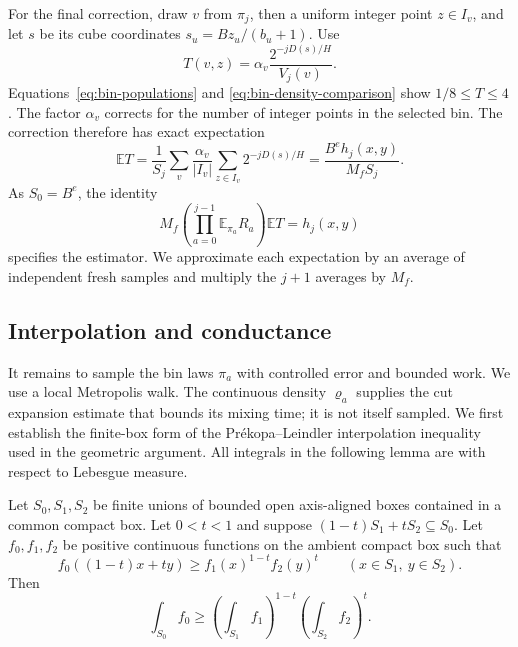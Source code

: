 For the final correction, draw $v$ from $\pi_j$, then a uniform integer
point $z\in I_v$, and let $s$ be its cube coordinates
$s_u=Bz_u/(b_u+1)$.  Use
\begin{equation}
 T(v,z)=\alpha_v\frac{2^{-jD(s)/H}}{V_j(v)}.
 \label{eq:oracle-correction}
\end{equation}
Equations~\eqref{eq:bin-populations} and
\eqref{eq:bin-density-comparison} show $1/8\le T\le4$.
The factor $\alpha_v$ corrects for the number of integer points in
the selected bin. The correction therefore has exact expectation
\[
 \mathbb E T
 =\frac{1}{S_j}\sum_v\frac{\alpha_v}{|I_v|}
                         \sum_{z\in I_v}2^{-jD(s)/H}
 =\frac{B^eh_j(x,y)}{M_fS_j}.
\]
As $S_0=B^e$, the identity
\begin{equation}
 M_f\left(\prod_{a=0}^{j-1}\mathbb E_{\pi_a}R_a\right)
       \mathbb E T=h_j(x,y)
 \label{eq:oracle-telescope}
\end{equation}
specifies the estimator.  We approximate each expectation by an average
of independent fresh samples and multiply the $j+1$ averages by $M_f$.

\subsection{Interpolation and conductance}

It remains to sample the bin laws $\pi_a$ with controlled error and
bounded work. We use a local Metropolis walk. The continuous density
$\varrho_a$ supplies the cut expansion estimate that bounds its mixing
time; it is not itself sampled. We first establish the finite-box form
of the Pr\'ekopa--Leindler interpolation
inequality~\cite{Leindler1972,Prekopa1973} used in the geometric
argument. All integrals in the following lemma are with
respect to Lebesgue measure.

\begin{lemma}
\label{lem:integral-interpolation}
Let $S_0,S_1,S_2$ be finite unions of bounded open axis-aligned boxes
contained in a common compact box.  Let $0<t<1$ and suppose
$(1-t)S_1+tS_2\subseteq S_0$.  Let $f_0,f_1,f_2$ be positive continuous
functions on the ambient compact box such that
\[
 f_0((1-t)x+ty)\ge f_1(x)^{1-t}f_2(y)^t
 \qquad(x\in S_1,\ y\in S_2).
\]
Then
\[
 \int_{S_0}f_0\ge
 \left(\int_{S_1}f_1\right)^{1-t}
 \left(\int_{S_2}f_2\right)^t.
\]
\end{lemma}

